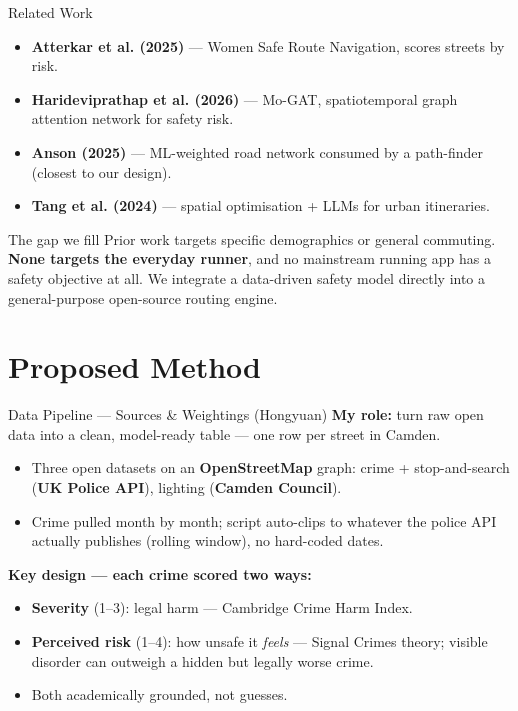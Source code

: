 \documentclass{beamer}
\begin{document}
\begin{frame}{Related Work}
  \begin{itemize}
    \item \textbf{Atterkar et al. (2025)} --- Women Safe Route Navigation, scores streets by risk.
    \item \textbf{Harideviprathap et al. (2026)} --- Mo-GAT, spatiotemporal graph attention network for safety risk.
    \item \textbf{Anson (2025)} --- ML-weighted road network consumed by a path-finder (closest to our design).
    \item \textbf{Tang et al. (2024)} --- spatial optimisation + LLMs for urban itineraries.
  \end{itemize}
  \vspace{0.5em}
  \begin{block}{The gap we fill}
    Prior work targets specific demographics or general commuting. \textbf{None targets the everyday runner}, and no mainstream running app has a safety objective at all. We integrate a data-driven safety model directly into a general-purpose open-source routing engine.
  \end{block}
\end{frame}

\section{Proposed Method}

\begin{frame}{Data Pipeline --- Sources \& Weightings \hfill \small(Hongyuan)}
  \textbf{My role:} turn raw open data into a clean, model-ready table --- one row per street in Camden.
  \vspace{0.4em}
  \begin{itemize}
    \item Three open datasets on an \textbf{OpenStreetMap} graph: crime + stop-and-search (\textbf{UK Police API}), lighting (\textbf{Camden Council}).
    \item Crime pulled month by month; script auto-clips to whatever the police API actually publishes (rolling window), no hard-coded dates.
  \end{itemize}
  \vspace{0.3em}
  \textbf{Key design --- each crime scored two ways:}
  \begin{itemize}
    \item \textbf{Severity} (1--3): legal harm --- Cambridge Crime Harm Index.
    \item \textbf{Perceived risk} (1--4): how unsafe it \emph{feels} --- Signal Crimes theory; visible disorder can outweigh a hidden but legally worse crime.
    \item Both academically grounded, not guesses.
  \end{itemize}
\end{frame}
\end{document}
